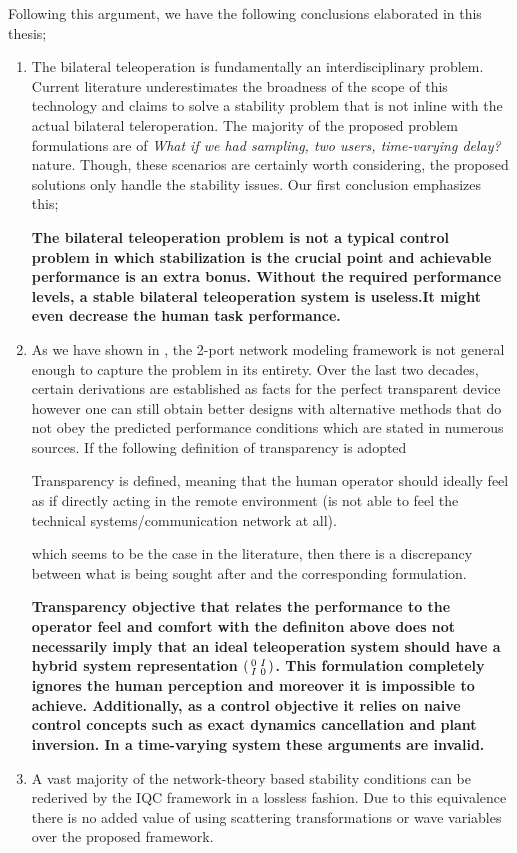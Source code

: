 Following this argument, we have the following conclusions elaborated in this thesis;
\begin{enumerate}
	\item The bilateral teleoperation is fundamentally an interdisciplinary problem. Current literature underestimates the broadness of the 
    scope of this technology and claims to solve a stability problem that is not inline with the actual bilateral teleroperation. The majority
    of the proposed problem formulations are of \emph{What if we had sampling, two users, time-varying delay?} nature. Though, these scenarios 
    are certainly worth considering, the proposed solutions only handle the stability issues. Our first conclusion emphasizes this;
    
    {\bfseries The bilateral teleoperation problem is not a typical control problem in which stabilization is the crucial point and 
    achievable performance is an extra bonus. Without the required performance levels, a stable bilateral teleoperation system is useless.It 
    might even decrease the human task performance.}
    
    \item As we have shown in , the 2-port network modeling framework is not general enough to capture the problem in
    its entirety. Over the last two decades, certain derivations are established as facts for the perfect transparent device however one 
    can still obtain better designs with alternative methods that do not obey the predicted performance conditions which are stated in 
    numerous sources. If the following definition of transparency is adopted
    \begin{displayquote}
    Transparency is defined, meaning that the human operator should ideally feel as if directly acting in the remote environment
    (is not able to feel the technical systems/communication network at all).
    \end{displayquote}
    which seems to be the case in the literature, then there is a discrepancy between what is being sought after and the corresponding 
    formulation. 
    
    {\bfseries Transparency objective that relates the performance to the operator feel and comfort with the definiton above does not 
    necessarily imply that an ideal teleoperation system should have a hybrid system representation $\begin{psmallmatrix}0&I\\I&0\end{psmallmatrix}$. 
    This formulation completely ignores the human perception and moreover it is impossible to achieve. Additionally, as a control objective 
    it relies on naive control concepts such as exact dynamics cancellation and plant inversion. In a time-varying system these arguments 
    are invalid.
    }
    \item A vast majority of the network-theory based stability conditions can be rederived by the IQC framework in a lossless fashion. 
    Due to this equivalence there is no added value of using scattering transformations or wave variables over the proposed framework. 
    

\end{enumerate}
